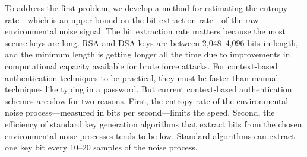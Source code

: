\documentclass[10pt,onecolumn]{article}
\begin{document}
To address the first problem, we develop a method for estimating the entropy rate---which is an upper bound on the bit extraction rate---of the raw environmental noise signal.
The bit extraction rate matters because the most secure keys are long.
RSA and DSA keys are between 2,048--4,096 bits in length, and the minimum length is getting longer all the time due to improvements in computational capacity available for brute force attacks.
For context-based authentication techniques to be practical, they must be faster than manual techniques like typing in a password.
But current context-based authentication schemes are slow for two reasons.
First, the entropy rate of the environmental noise process---measured in bits per second---limits the speed.
Second, the efficiency of standard key generation algorithms that extract bits from the chosen environmental noise processes tends to be low.
Standard algorithms can extract one key bit every 10--20 samples of the noise process.
\end{document}
